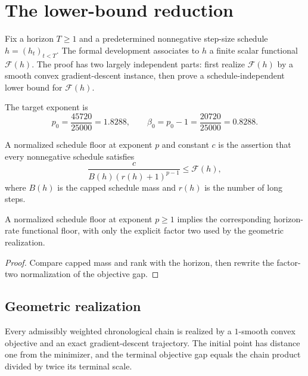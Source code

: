 \chapter{The lower-bound reduction}

Fix a horizon $T\geq 1$ and a predetermined nonnegative step-size schedule
$h=(h_t)_{t<T}$.  The formal development associates to $h$ a finite scalar
functional $\mathcal F(h)$.  The proof has two largely independent parts:
first realize $\mathcal F(h)$ by a smooth convex gradient-descent instance,
then prove a schedule-independent lower bound for $\mathcal F(h)$.

The target exponent is
\[
  p_0=\frac{45720}{25000}=1.8288,
  \qquad
  \beta_0=p_0-1=\frac{20720}{25000}=0.8288.
\]

\begin{definition}
  \label{def:normalized-floor}
  \leanok
  A normalized schedule floor at exponent $p$ and constant $c$ is the
  assertion that every nonnegative schedule satisfies
  \[
    \frac{c}{B(h)(r(h)+1)^{p-1}}\leq \mathcal F(h),
  \]
  where $B(h)$ is the capped schedule mass and $r(h)$ is the number of long
  steps.
\end{definition}

\begin{theorem}
  \label{thm:floor-reduction}
  \leanok
  A normalized schedule floor at exponent $p\geq1$ implies the corresponding
  horizon-rate functional floor, with only the explicit factor two used by
  the geometric realization.
\end{theorem}

\begin{proof}
  \leanok
  Compare capped mass and rank with the horizon, then rewrite the factor-two
  normalization of the objective gap.
\end{proof}

\section{Geometric realization}

\begin{theorem}
  \label{thm:geometric-realization}
  \leanok
  Every admissibly weighted chronological chain is realized by a
  $1$-smooth convex objective and an exact gradient-descent trajectory.  The
  initial point has distance one from the minimizer, and the terminal
  objective gap equals the chain product divided by twice its terminal
  scale.
\end{theorem}

